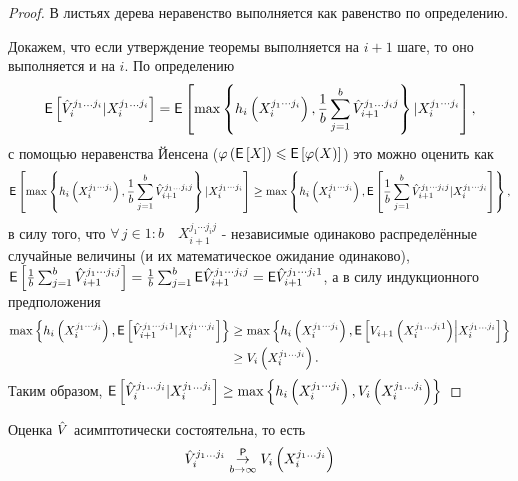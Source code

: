 	\begin{proof}
		\par В листьях дерева неравенство выполняется как равенство по определению.
		\par Докажем, что если утверждение теоремы выполняется на $i+1$ шаге, то оно выполняется и на $i$. По определению
		\begin{equation*}
		\mathsf{E}\left[\hat{V}_i^{j_1\ldots j_i}|X_i^{j_1\ldots j_i}\right] = \mathsf{E}\left[ \max\left\lbrace h_i\left(X_i^{j_1\cdots j_i}\right), \frac{1}{b}\sum_{j = 1}^b \hat{V}_{i+1}^{j_1 \ldots j_i j}\right\rbrace | X_i^{j_1\cdots j_i} \right],
		\end{equation*}
		с помощью неравенства Йенсена ($\varphi\left(\mathsf{E}\left[X\right]\right) \leqslant \mathsf{E}\left[\varphi(X)\right]$) это можно оценить как
		\begin{equation*}
		\mathsf{E}\left[ \max\left\lbrace h_i\left(X_i^{j_1\cdots j_i}\right), \frac{1}{b}\sum_{j = 1}^b \hat{V}_{i+1}^{j_1 \ldots j_i j}\right\rbrace | X_i^{j_1\cdots j_i} \right] \geq \max\left\lbrace h_i\left(X_i^{j_1\cdots j_i}\right), \mathsf{E}\left[ \frac{1}{b}\sum_{j = 1}^b \hat{V}_{i+1}^{j_1 \cdots j_i j} | X_i^{j_1\cdots j_i} \right] \right\rbrace,
		\end{equation*}
		в силу того, что $\forall \, j \in 1:b \quad X_{i+1}^{j_1\cdots j_i j}$ - независимые одинаково распределённые случайные величины (и их математическое ожидание одинаково), $\mathsf{E}\left[ \frac{1}{b}\sum_{j = 1}^b \hat{V}_{i+1}^{j_1 \cdots j_i j} \right] = \frac{1}{b}\sum_{j = 1}^b \mathsf{E}\hat{V}_{i+1}^{j_1 \cdots j_i j} = \mathsf{E}\hat{V}_{i+1}^{j_1 \cdots j_i 1}$, а в силу индукционного предположения
		\begin{equation*}
		\begin{aligned}
		\max\left\lbrace 
			h_i\left(X_i^{j_1\cdots j_i}\right), 
			\mathsf{E}\left[ \hat{V}_{i+1}^{j_1 \cdots j_i 1} | X_i^{j_1\cdots j_i} \right] 
		\right\rbrace &\geq \max \left\lbrace 
			h_i\left(X_i^{j_1\cdots j_i}\right),
			\mathsf{E}\left[V_{i+1}\left(X_i^{j_1\ldots j_i 1}\right)\middle\vert X_i^{j_1\ldots j_i}\right]
		\right\rbrace \\ &\geq V_i\left(X_i^{j_1\ldots j_i}\right).
		\end{aligned}
		\end{equation*}
		Таким образом, $\mathsf{E}\left[\hat{V}_i^{j_1\ldots j_i}|X_i^{j_1\ldots j_i}\right] \geq \max \left\lbrace h_i\left(X_i^{j_1\cdots j_i}\right), V_i\left(X_i^{j_1\ldots j_i}\right) \right\rbrace$
	\end{proof}
	\begin{theorem}\label{thm:consistency} Оценка $\hat{V}$ асимптотически состоятельна, то есть
		$$\hat{V}_i^{j_1\ldots j_i} \underset{b\to\infty}{\overset{\mathsf{P}}{\to}} V_i\left(X_i^{j_1\ldots j_i}\right)$$
	\end{theorem}

